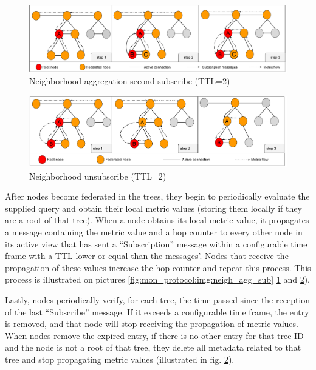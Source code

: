 \begin{figure}[htbp]
    \centering
    \includegraphics[width=\textwidth]{Chapters/aggregation/images/2nd_subscribe.pdf}
    \caption{Neighborhood aggregation second subscribe (TTL=2)}
    \label{fig:mon_protocol:img:neigh_agg_second_sub}
\end{figure}


\begin{figure}[htbp]
    \centering
    \includegraphics[width=\textwidth]{Chapters/aggregation/images/unsubscribe_process.pdf}
    \caption{Neighborhood unsubscribe (TTL=2)}
    \label{fig:mon_protocol:img:neigh_agg_unsub}
\end{figure}

After nodes become federated in the trees, they begin to periodically evaluate the supplied query and obtain their local metric values (storing them locally if they are a root of that tree). When a node obtains its local metric value, it propagates a message containing the metric value and a hop counter to every other node in its active view that has sent a ``Subscription'' message within a configurable time frame with a TTL lower or equal than the messages'. Nodes that receive the propagation of these values increase the hop counter and repeat this process. This process is illustrated on pictures \ref{fig:mon_protocol:img:neigh_agg_sub} \ref{fig:mon_protocol:img:neigh_agg_second_sub} and \ref{fig:mon_protocol:img:neigh_agg_unsub}). 
    
Lastly, nodes periodically verify, for each tree, the time passed since the reception of the last ``Subscribe'' message. If it exceeds a configurable time frame, the entry is removed, and that node will stop receiving the propagation of metric values. When nodes remove the expired entry, if there is no other entry for that tree ID and the node is not a root of that tree, they delete all metadata related to that tree and stop propagating metric values (illustrated in fig. \ref{fig:mon_protocol:img:neigh_agg_unsub}).

